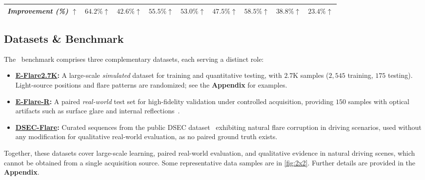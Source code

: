 \begin{table}[!tbp]
{\begin{tabular}{lcccccccc}
    \\
    \emph{Improvement (\%)} $\uparrow$ & $64.2\%$$\uparrow$ & $42.6\%$$\uparrow$ & $55.5\%$$\uparrow$ & $53.0\%$$\uparrow$ & $47.5\%$$\uparrow$ & $58.5\%$$\uparrow$ & $38.8\%$$\uparrow$ & $23.4\%$$\uparrow$
    \\
    \bottomrule
    \end{tabular}}
    \label{tab:main_sim_quant}
\end{table}



\subsection{Datasets \& Benchmark}
The \emph{\ours}~benchmark comprises three complementary datasets, each serving a distinct role:
\begin{itemize}
    \item \textbf{\underline{E-Flare2.7K}:} A large-scale \emph{simulated} dataset for training and quantitative testing, with $2.7$K samples ($2{,}545$ training, $175$ testing). Light-source positions and flare patterns are randomized; see the \textbf{Appendix} for examples.

    \item \textbf{\underline{E-Flare-R}:} A paired \emph{real-world} test set for high-fidelity validation under controlled acquisition, providing $150$ samples with optical artifacts such as surface glare and internal reflections~\cite{shi2023identifying}.

    \item \textbf{\underline{DSEC-Flare}:} Curated sequences from the public DSEC dataset~\cite{gehrig2021dsec} exhibiting natural flare corruption in driving scenarios, used without any modification for qualitative real-world evaluation, as no paired ground truth exists.
\end{itemize}

Together, these datasets cover large-scale learning, paired real-world evaluation, and qualitative evidence in natural driving scenes, which cannot be obtained from a single acquisition source. Some representative data samples are in \cref{fig:2x2}. Further details are provided in the \textbf{Appendix}.
